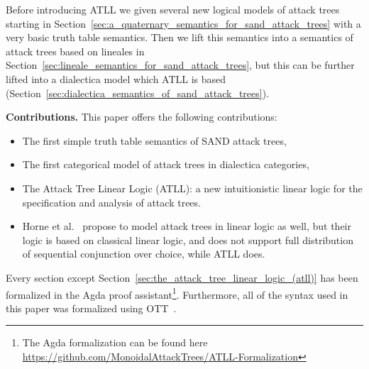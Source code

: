 Before introducing ATLL we given several new logical models of attack
trees starting in
Section~\ref{sec:a_quaternary_semantics_for_sand_attack_trees} with a
very basic truth table semantics.  Then we lift this semantics into a
semantics of attack trees based on lineales in
Section~\ref{sec:lineale_semantics_for_sand_attack_trees}, but this
can be further lifted into a dialectica model which ATLL is based
(Section~\ref{sec:dialectica_semantics_of_sand_attack_trees}).

\textbf{Contributions.}  This paper offers the following
contributions:
\begin{itemize}
\item The first simple truth table semantics of SAND attack trees,
\item The first categorical model of attack trees in dialectica
  categories,
\item The Attack Tree Linear Logic (ATLL): a new intuitionistic linear
  logic for the specification and analysis of attack trees.

\item Horne et al.~\cite{horne2017semantics} propose to model attack
  trees in linear logic as well, but their logic is based on classical
  linear logic, and does not support full distribution of sequential
  conjunction over choice, while ATLL does.
\end{itemize}

Every section except
Section~\ref{sec:the_attack_tree_linear_logic_(atll)} has been
formalized in the Agda proof assistant\footnote{The Agda formalization
  can be found here
  \url{https://github.com/MonoidalAttackTrees/ATLL-Formalization}}.
Furthermore, all of the syntax used in this paper was formalized using
OTT~\cite{Sewell:2010}.
